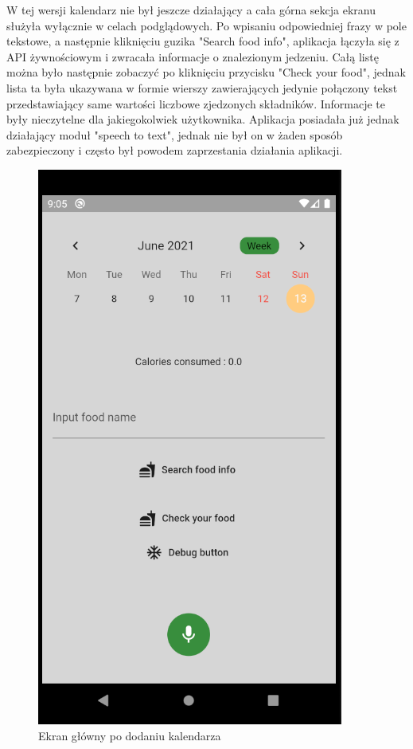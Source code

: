 \documentclass[12pt, a4paper]{article}
\begin{document}
\begin{sloppypar}
{{    W tej wersji kalendarz nie był jeszcze działający a cała górna sekcja ekranu służyła wyłącznie
    w celach podglądowych. Po wpisaniu odpowiedniej frazy w pole tekstowe, a następnie kliknięciu
    guzika "Search food info", aplikacja łączyła się z API żywnościowym i zwracała informacje
    o znalezionym jedzeniu. Całą listę można było następnie zobaczyć po kliknięciu przycisku
    "Check your food", jednak lista ta była ukazywana w formie wierszy zawierających jedynie
    połączony tekst przedstawiający same wartości liczbowe zjedzonych składników. Informacje te
    były nieczytelne dla jakiegokolwiek użytkownika. Aplikacja posiadała już jednak działający
    moduł "speech to text", jednak nie był on w żaden sposób zabezpieczony i często był powodem
    zaprzestania działania aplikacji.
  
    \begin{figure}[H]
      \centering
      \includegraphics[scale=0.9]{screen_home_old.PNG}
      \caption{Ekran główny po dodaniu kalendarza}
      \label{fig:screen_old}
    \end{figure}

}}
\end{sloppypar}
\end{document}
